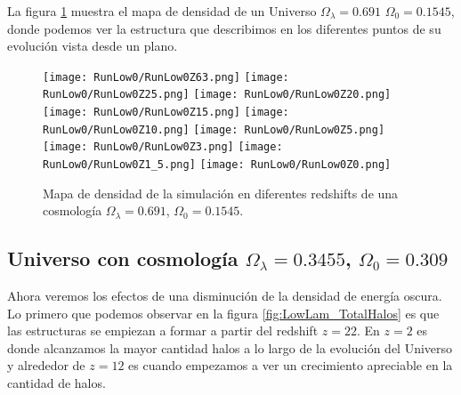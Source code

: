 La figura \ref{fig:Low0-DensityMap} muestra el mapa de densidad de un Universo $\Omega_\lambda = 0.691$ $\Omega_0 = 0.1545$, donde podemos ver la estructura que describimos en los diferentes puntos de su evolución vista desde un plano.
\begin{figure}[H]
    \centering

    \texttt{[image: RunLow0/RunLow0Z63.png]}   %
    \texttt{[image: RunLow0/RunLow0Z25.png]}   %
    \texttt{[image: RunLow0/RunLow0Z20.png]}   %
    \\
    \texttt{[image: RunLow0/RunLow0Z15.png]}   %
    \texttt{[image: RunLow0/RunLow0Z10.png]}   %
    \texttt{[image: RunLow0/RunLow0Z5.png]}    %
    \\
    \texttt{[image: RunLow0/RunLow0Z3.png]}    %
    \texttt{[image: RunLow0/RunLow0Z1\_5.png]}  %
    \texttt{[image: RunLow0/RunLow0Z0.png]}    %
    \caption[Mapa de densidad de un Universo en en diferentes redshift]{ \footnotesize Mapa de densidad de la simulación en diferentes redshifts de una cosmología $\Omega_\lambda = 0.691$, $\Omega_0 = 0.1545$. }
    \label{fig:Low0-DensityMap}
\end{figure}


\subsection{Universo con cosmología \texorpdfstring{$\Omega_\lambda = 0.3455$, $\Omega_0 = 0.309$ }{Omega lambda = 0.3455, Omega 0 = 0.309}  }

Ahora veremos los efectos de una disminución de la densidad de energía oscura. Lo primero que podemos observar en la figura \ref{fig:LowLam_TotalHalos} es que las estructuras se empiezan a formar a partir del redshift $z=22$. En $z= 2$ es donde alcanzamos la mayor cantidad halos a lo largo de la evolución del Universo y alrededor de $z = 12$ es cuando empezamos a ver un crecimiento apreciable en la cantidad de halos.

